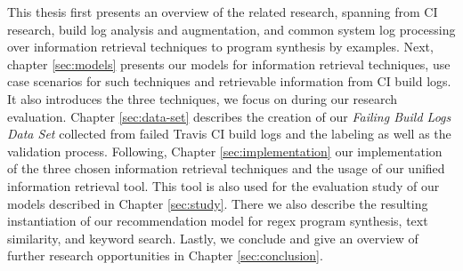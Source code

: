 \documentclass[\myrootdir/main.tex]{subfiles}
\begin{document}
This thesis first presents an overview of the related research, spanning from CI research, build log analysis and augmentation, and common system log processing over information retrieval techniques to program synthesis by examples.
Next, chapter \ref{sec:models} presents our models for information retrieval techniques, use case scenarios for such techniques and retrievable information from CI build logs. It also introduces the three techniques, we focus on during our research evaluation.
Chapter \ref{sec:data-set} describes the creation of our \emph{Failing Build Logs Data Set} collected from failed Travis CI build logs and the labeling as well as the validation process.
Following, Chapter \ref{sec:implementation} our implementation of the three chosen information retrieval techniques and the usage of our unified information retrieval tool.
This tool is also used for the evaluation study of our models described in Chapter \ref{sec:study}. There we also describe the resulting instantiation of our recommendation model for regex program synthesis, text similarity, and keyword search.
Lastly, we conclude and give an overview of further research opportunities in Chapter \ref{sec:conclusion}.
\end{document}
